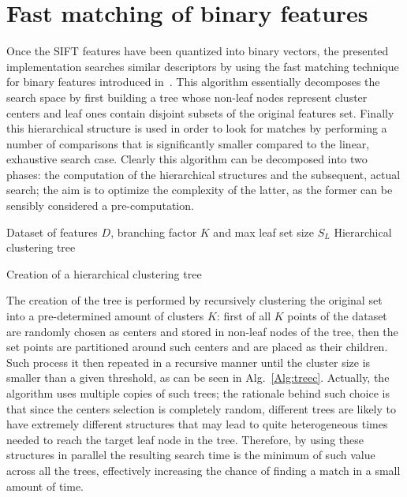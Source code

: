 \documentclass[a4paper, 11pt, oneside]{article}
\begin{document}
    \section*{Fast matching of binary features}
Once the SIFT features have been quantized into binary vectors, the presented implementation searches similar descriptors by using the fast matching technique for binary features introduced in~\cite{muja2012fast}. This algorithm essentially decomposes the search space by first building a tree whose non-leaf nodes represent cluster centers and leaf ones contain disjoint subsets of the original features set. Finally this hierarchical structure is used in order to look for matches by performing a number of comparisons that is significantly smaller compared to the linear, exhaustive search case. Clearly this algorithm can be decomposed into two phases: the computation of the hierarchical structures and the subsequent, actual search; the aim is to optimize the complexity of the latter, as the former can be sensibly considered a pre-computation.

\begin{algorithm}[h!]
\begin{algorithmic}[1]
 \REQUIRE Dataset of features $D$, branching factor $K$ and max leaf set size $S_{L}$
 \ENSURE Hierarchical clustering tree
 \ELSE 
 \ENDFOR
 \ENDIF
 \end{algorithmic}
 \caption{Creation of a hierarchical clustering tree}\label{Alg:treec}
\end{algorithm}

The creation of the tree is performed by recursively clustering the original set into a pre-determined amount of clusters $K$: first of all $K$ points of the dataset are randomly chosen as centers and stored in non-leaf nodes of the tree, then the set points are partitioned around such centers and are placed as their children. Such process it then repeated in a recursive manner until the cluster size is smaller than a given threshold, as can be seen in Alg.~\ref{Alg:treec}.
 Actually, the algorithm uses multiple copies of such trees; the rationale behind such choice is that since the centers selection is completely random, different trees are likely to have extremely different structures that may lead to quite heterogeneous times needed to reach the target leaf node in the tree. Therefore, by using these structures in parallel the resulting search time is the minimum of such value across all the trees, effectively increasing the chance of finding a match in a small amount of time. 
\end{document}
